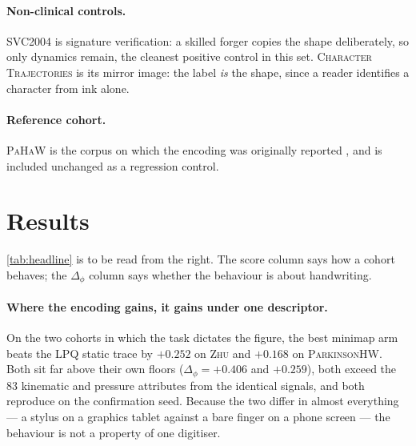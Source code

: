 \documentclass{article}
\begin{document}
\paragraph{Non-clinical controls.} \textsc{SVC2004} \citep{yeung2004svc} is signature
verification: a skilled forger copies the shape deliberately, so only dynamics remain, the
cleanest positive control in this set. \textsc{Character Trajectories}
\citep{williams2006chartraj} is its mirror image: the label \emph{is} the shape, since a reader
identifies a character from ink alone.

\paragraph{Reference cohort.} \textsc{PaHaW} \citep{drotar2016pahaw} is the corpus on which the
encoding was originally reported \citep{prior2027minimaps}, and is included unchanged as a
regression control.

\section{Results}
\label{sec:results}



\cref{tab:headline} is to be read from the right. The score column says how a cohort behaves; the
$\Delta_\phi$ column says whether the behaviour is about handwriting.

\paragraph{Where the encoding gains, it gains under one descriptor.} On the two cohorts in which the
task dictates the figure, the best minimap arm beats the LPQ static trace by $+0.252$ on
\textsc{Zhu} and $+0.168$ on \textsc{ParkinsonHW}. Both sit far above their own floors
($\Delta_\phi = +0.406$ and $+0.259$), both exceed the $83$ kinematic and pressure attributes
from the identical signals, and both reproduce on the confirmation seed. Because
the two differ in almost everything --- a stylus on a graphics tablet against a bare finger on a
phone screen --- the behaviour is not a property of one digitiser.


\end{document}
